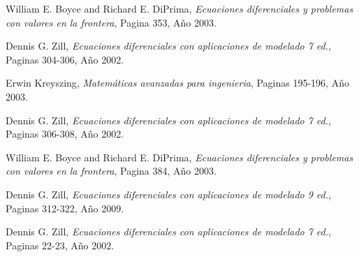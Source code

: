 \documentclass[titlepage]{article}
\begin{document}
    \begin{thebibliography}{15}
        
            William E. Boyce and Richard E. DiPrima,
            \emph{Ecuaciones diferenciales y problemas con valores en la frontera},
            Pagina 353,
            Año 2003.
        
            Dennis G. Zill,
            \emph{Ecuaciones diferenciales con aplicaciones de modelado 7 ed.},
            Paginas 304-306,
            Año 2002.
            
            Erwin Kreyszing,
            \emph{Matemáticas avanzadas para ingenieria},
            Paginas 195-196,
            Año 2003.
        
            Dennis G. Zill,
            \emph{Ecuaciones diferenciales con aplicaciones de modelado 7 ed.},
            Paginas 306-308,
            Año 2002.
            
            William E. Boyce and Richard E. DiPrima,
            \emph{Ecuaciones diferenciales y problemas con valores en la frontera},
            Pagina 384,
            Año 2003.
            
            Dennis G. Zill,
            \emph{Ecuaciones diferenciales con aplicaciones de modelado 9 ed.},
            Paginas 312-322,
            Año 2009.
            
            Dennis G. Zill,
            \emph{Ecuaciones diferenciales con aplicaciones de modelado 7 ed.},
            Paginas 22-23,
            Año 2002.
            
        \end{thebibliography}
    
        
\end{document}
